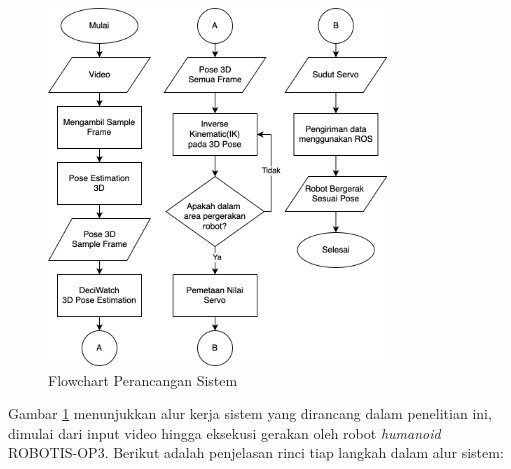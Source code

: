 \begin{figure}[H]
    \centering
    \includegraphics[width=0.8\textwidth]{images/system_flowchart.png}
    \caption{Flowchart Perancangan Sistem}
    \label{fig:flowchart_sistem}
\end{figure}

Gambar \ref{fig:flowchart_sistem} menunjukkan alur kerja sistem yang dirancang dalam penelitian ini, dimulai dari input video hingga eksekusi gerakan oleh robot \textit{humanoid} ROBOTIS-OP3. Berikut adalah penjelasan rinci tiap langkah dalam alur sistem:


